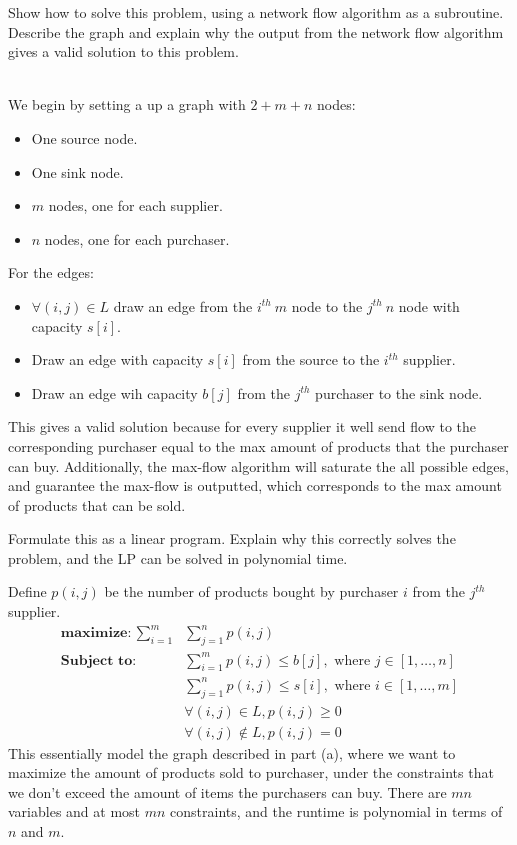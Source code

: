 \documentclass[11pt]{article}
\begin{document}
\begin{subparts}
\subpart
Show how to solve this problem, using
a network flow algorithm as a subroutine.
Describe the graph
and explain why the output from the network flow algorithm
gives a valid solution to this problem.\\
\begin{solution}\\
    We begin by setting a up a graph with $2+m+n$ nodes:
    \begin{itemize}
        \item One source node.
        \item One sink node.
        \item $m$ nodes, one for each supplier.
        \item $n$ nodes, one for each purchaser.
    \end{itemize}
    For the edges:
    \begin{itemize}
        \item $\forall(i, j)\in L$ draw an edge from the $i^{th} ~m$ node to the $j^{th} ~n$ node with capacity
        $s[i]$. 
        \item Draw an edge with capacity $s[i]$ from the source to the $i^{th}$ supplier.
        \item Draw an edge wih capacity $b[j]$ from the $j^{th}$ purchaser to the sink node.
    \end{itemize}
    This gives a valid solution because for every supplier it well send flow to the corresponding purchaser equal to the 
    max amount of products that the purchaser can buy. Additionally, the max-flow algorithm will saturate the all possible edges, and guarantee 
    the max-flow is outputted, which corresponds to the max amount of products that can be sold. 
\end{solution}
\subpart Formulate this as a linear program.
Explain why this correctly solves the problem, and the LP can be solved in polynomial time.\\
\begin{solution}
    Define $p(i, j)$ be the number of products bought by purchaser $i$ from the $j^{th}$ supplier.
    \begin{align*}
        \textbf{maximize: }\sum_{i=1}^{m} &\sum_{j=1}^{n}p(i, j)\\
        \textbf{Subject to: } &\sum_{i=1}^{m}p(i, j) \le b[j], \text{ where } j \in [1,\dots, n]\\
        &\sum_{j=1}^{n} p(i, j) \le s[i],  \text{ where } i \in [1, \dots, m]\\
        &\forall (i, j) \in L, p(i, j) \geq 0\\
        &\forall (i, j) \not \in L, p(i, j) = 0
    \end{align*}
    This essentially model the graph described in part (a), where we want to maximize the amount of products
    sold to purchaser, under the constraints that we don't exceed the amount of items the purchasers can buy.
    There are $mn$ variables and at most $mn$ constraints, and the runtime is polynomial in terms of $n$ and $m$.
\end{solution}


\end{subparts}
\end{document}
